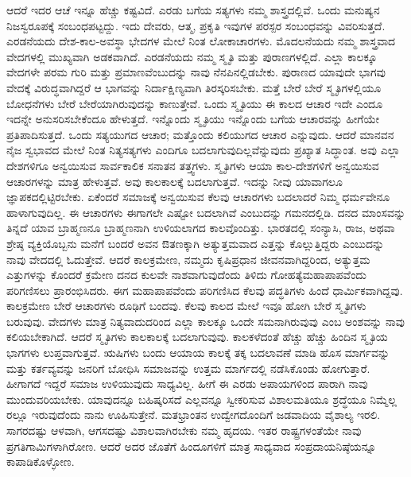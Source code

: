 ಆದರೆ ಇದರ ಆಚೆ ಇನ್ನೂ ಹೆಚ್ಚು ಕಷ್ಟವಿದೆ. ಎರಡು ಬಗೆಯ ಸತ್ಯಗಳು ನಮ್ಮ ಶಾಸ್ತ್ರದಲ್ಲಿವೆ. ಒಂದು ಮನುಷ್ಯನ ನಿಜಸ್ವರೂಪಕ್ಕೆ ಸಂಬಂಧಪಟ್ಟದ್ದು. ಇದು ದೇವರು, ಆತ್ಮ, ಪ್ರಕೃತಿ ಇವುಗಳ ಪರಸ್ಪರ ಸಂಬಂಧವನ್ನು ವಿವರಿಸುತ್ತದೆ. ಎರಡನೆಯದು ದೇಶ-ಕಾಲ-ಅವಸ್ಥಾ ಭೇದಗಳ ಮೇಲೆ ನಿಂತ ಲೋಕಾಚಾರಗಳು. ಮೊದಲನೆಯದು ನಮ್ಮ ಶಾಸ್ತ್ರವಾದ ವೇದಗಳಲ್ಲಿ ಮುಖ್ಯವಾಗಿ ಅಡಕವಾಗಿದೆ. ಎರಡನೆಯದು ನಮ್ಮ ಸ್ಮೃತಿ ಮತ್ತು ಪುರಾಣಗಳಲ್ಲಿದೆ. ಎಲ್ಲಾ ಕಾಲಕ್ಕೂ ವೇದಗಳೇ ಪರಮ ಗುರಿ ಮತ್ತು ಪ್ರಮಾಣವೆಂಬುದನ್ನು ನಾವು ನೆನಪಿನಲ್ಲಿಡಬೇಕು. ಪುರಾಣದ ಯಾವುದೇ ಭಾಗವು ವೇದಕ್ಕೆ ವಿರುದ್ಧವಾಗಿದ್ದರೆ ಆ ಭಾಗವನ್ನು ನಿರ್ದಾಕ್ಷಿಣ್ಯವಾಗಿ ತಿರಸ್ಕರಿಸಬೇಕು. ಮತ್ತೆ ಬೇರೆ ಬೇರೆ ಸ್ಮೃತಿಗಳಲ್ಲಿಯೂ ಬೋಧನೆಗಳು ಬೇರೆ ಬೇರೆಯಾಗಿರುವುದನ್ನು ಕಾಣುತ್ತೇವೆ. ಒಂದು ಸ್ಮೃತಿಯು ಈ ಕಾಲದ ಆಚಾರ ಇದೇ ಎಂದೂ ಇದನ್ನೇ ಅನುಸರಿಸಬೇಕೆಂದೂ ಹೇಳುತ್ತದೆ. ಇನ್ನೊಂದು ಸ್ಮೃತಿಯು ಇನ್ನೊಂದು ಬಗೆಯ ಆಚಾರವನ್ನು ಹೀಗೆಯೇ ಪ್ರತಿಪಾದಿಸುತ್ತದೆ. ಒಂದು ಸತ್ಯಯುಗದ ಆಚಾರ; ಮತ್ತೊಂದು ಕಲಿಯುಗದ ಆಚಾರ ಎನ್ನುವುದು. ಆದರೆ ಮಾನವನ ನೈಜ ಸ್ವಭಾವದ ಮೇಲೆ ನಿಂತ ನಿತ್ಯಸತ್ಯಗಳು ಎಂದಿಗೂ ಬದಲಾಗುವುದಿಲ್ಲವೆನ್ನುವುದು ಪ್ರಖ್ಯಾತ ಸಿದ್ಧಾಂತ. ಅವು ಎಲ್ಲಾ ದೇಶಗಳಿಗೂ ಅನ್ವಯಿಸುವ ಸಾರ್ವಕಾಲಿಕ ಸನಾತನ ತತ್ತ್ವಗಳು. ಸ್ಮೃತಿಗಳು ಆಯಾ ಕಾಲ-ದೇಶಗಳಿಗೆ ಅನ್ವಯಿಸುವ ಆಚಾರಗಳನ್ನು ಮಾತ್ರ ಹೇಳುತ್ತವೆ. ಅವು ಕಾಲಕಾಲಕ್ಕೆ ಬದಲಾಗುತ್ತವೆ. ಇದನ್ನು ನೀವು ಯಾವಾಗಲೂ ಜ್ಞಾಪಕದಲ್ಲಿಟ್ಟಿರಬೇಕು. ಏಕೆಂದರೆ ಸಮಾಜಕ್ಕೆ ಅನ್ವಯಿಸುವ ಕೆಲವು ಆಚಾರಗಳು ಬದಲಾದರೆ ನಿಮ್ಮ ಧರ್ಮವೇನೂ ಹಾಳಾಗುವುದಿಲ್ಲ. ಈ ಆಚಾರಗಳು ಈಗಾಗಲೇ ಎಷ್ಟೋ ಬದಲಾಗಿವೆ ಎಂಬುದನ್ನು ಗಮನದಲ್ಲಿಡಿ. ದನದ ಮಾಂಸವನ್ನು ತಿನ್ನದೆ ಯಾವ ಬ್ರಾಹ್ಮಣನೂ ಬ್ರಾಹ್ಮಣನಾಗಿ ಉಳಿಯಲಾಗದ ಕಾಲವೊಂದಿತ್ತು. ಭಾರತದಲ್ಲಿ ಸಂನ್ಯಾಸಿ, ರಾಜ, ಅಥವಾ ಶ್ರೇಷ್ಠ ವ್ಯಕ್ತಿಯೊಬ್ಬನು ಮನೆಗೆ ಬಂದರೆ ಅವನ ಔತಣಕ್ಕಾಗಿ ಅತ್ಯುತ್ತಮವಾದ ಎತ್ತನ್ನು ಕೊಲ್ಲುತ್ತಿದ್ದರು ಎಂಬುದನ್ನು ನಾವು ವೇದದಲ್ಲಿ ಓದುತ್ತೇವೆ. ಆದರೆ ಕಾಲಕ್ರಮೇಣ, ನಮ್ಮದು ಕೃಷಿಪ್ರಧಾನ ಜೀವನವಾಗಿದ್ದರಿಂದ, ಅತ್ಯುತ್ತಮ ಎತ್ತುಗಳನ್ನು ಕೊಂದರೆ ಕ್ರಮೇಣ ದನದ ಕುಲವೇ ನಾಶವಾಗುವುದೆಂದು ತಿಳಿದು ಗೋಹತ್ಯೆ\break ಮಹಾಪಾಪವೆಂದು ಪರಿಗಣಿಸಲು ಪ್ರಾರಂಭಿಸಿದರು. ಈಗ ಮಹಾಪಾಪವೆಂದು ಪರಿಗಣಿಸಿದ ಕೆಲವು ಪದ್ಧತಿಗಳು ಹಿಂದೆ ಧಾರ್ಮಿಕವಾಗಿದ್ದವು. ಕಾಲಕ್ರಮೇಣ ಬೇರೆ ಆಚಾರಗಳು ರೂಢಿಗೆ ಬಂದವು. ಕೆಲವು ಕಾಲದ ಮೇಲೆ ಇವೂ ಹೋಗಿ ಬೇರೆ ಸ್ಮೃತಿಗಳು ಬರುವುವು. ವೇದಗಳು ಮಾತ್ರ ನಿತ್ಯವಾದುದರಿಂದ ಎಲ್ಲಾ ಕಾಲಕ್ಕೂ ಒಂದೇ ಸಮನಾಗಿರುವುವು ಎಂಬ ಅಂಶವನ್ನು ನಾವು ಕಲಿಯಬೇಕಾಗಿದೆ. ಆದರೆ ಸ್ಮೃತಿಗಳು ಕಾಲಕಾಲಕ್ಕೆ ಬದಲಾಗುವುವು. ಕಾಲಕಳೆದಂತೆ ಹೆಚ್ಚು ಹೆಚ್ಚು ಹಿಂದಿನ ಸ್ಮೃತಿಯ ಭಾಗಗಳು ಲುಪ್ತವಾಗುತ್ತವೆ. ಋಷಿಗಳು ಬಂದು ಆಯಾಯ ಕಾಲಕ್ಕೆ ತಕ್ಕ ಬದಲಾವಣೆ ಮಾಡಿ ಹೊಸ ಮಾರ್ಗವನ್ನು ಮತ್ತು ಕರ್ತವ್ಯವನ್ನು ಜನರಿಗೆ ಬೋಧಿಸಿ ಸಮಾಜವನ್ನು ಉತ್ತಮ ಮಾರ್ಗದಲ್ಲಿ ನಡೆಸಿಕೊಂಡು ಹೋಗುತ್ತಾರೆ. ಹೀಗಾಗದೆ ಇದ್ದರೆ ಸಮಾಜ ಉಳಿಯುವುದು ಸಾಧ್ಯವಿಲ್ಲ. ಹೀಗೆ ಈ ಎರಡು ಅಪಾಯಗಳಿಂದ ಪಾರಾಗಿ ನಾವು ಮುಂದುವರಿಯಬೇಕು. ಯಾವುದನ್ನೂ ಬಹಿಷ್ಕರಿಸದೆ ಎಲ್ಲವನ್ನೂ ಸ್ವೀಕರಿಸುವ ವಿಶಾಲಮತಿಯೂ ಶ್ರದ್ಧೆಯೂ ನಿಮ್ಮೆಲ್ಲ ರಲ್ಲೂ ಇರುವುದೆಂದು ನಾನು ಊಹಿಸುತ್ತೇನೆ. ಮತಭ್ರಾಂತನ ಉದ್ವೇಗದೊಂದಿಗೆ ಜಡವಾದಿಯ ವೈಶಾಲ್ಯ ಇರಲಿ. ಸಾಗರದಷ್ಟು ಆಳವಾಗಿ, ಆಗಸದಷ್ಟು ವಿಶಾಲವಾಗಿರಬೇಕು ನಮ್ಮ ಹೃದಯ. ಇತರ ರಾಷ್ಟ್ರಗಳಂತೆಯೇ ನಾವು ಪ್ರಗತಿಗಾಮಿಗಳಾಗಿರೋಣ. ಆದರೆ ಅದರ ಜೊತೆಗೆ ಹಿಂದೂಗಳಿಗೆ ಮಾತ್ರ ಸಾಧ್ಯವಾದ ಸಂಪ್ರದಾಯನಿಷ್ಠೆಯನ್ನೂ ಕಾಪಾಡಿಕೊಳ್ಳೋಣ.

